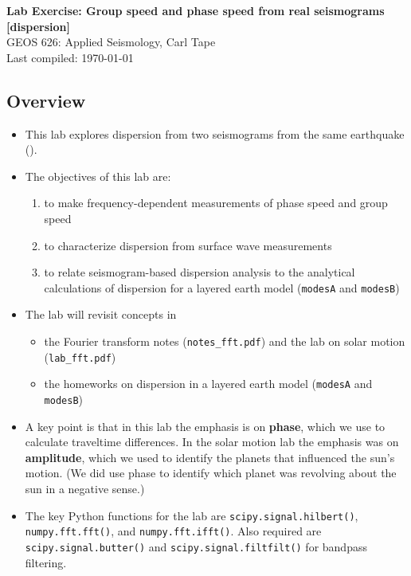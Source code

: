 \documentclass[11pt,titlepage,fleqn]{article}
\begin{document}

\begin{spacing}{1.2}
\centering
{\large \bf Lab Exercise: Group speed and phase speed from real seismograms [dispersion]} \\
GEOS 626: Applied Seismology, Carl Tape \\
Last compiled: \today \\
\end{spacing}


\subsection*{Overview}

\begin{itemize}
\item This lab explores dispersion from two seismograms from the same earthquake ().

\item The objectives of this lab are:
%
\begin{enumerate}
\item to make frequency-dependent measurements of phase speed and group speed
\item to characterize dispersion from surface wave measurements
\item to relate seismogram-based dispersion analysis to the analytical calculations of dispersion for a layered earth model (\verb+modesA+ and \verb+modesB+)
\end{enumerate}

\item The lab will revisit concepts in
%
\begin{itemize}
\item the Fourier transform notes (\verb+notes_fft.pdf+) and the lab on solar motion (\verb+lab_fft.pdf+)
\item the homeworks on dispersion in a layered earth model (\verb+modesA+ and \verb+modesB+)
\end{itemize}

\item A key point is that in this lab the emphasis is on {\bf phase}, which we use to calculate traveltime differences. In the solar motion lab the emphasis was on {\bf amplitude}, which we used to identify the planets that influenced the sun's motion. (We did use phase to identify which planet was revolving about the sun in a negative sense.)

\item The key Python functions for the lab are \verb+scipy.signal.hilbert()+, \verb+numpy.fft.fft()+, and \verb+numpy.fft.ifft()+. Also required are \verb+scipy.signal.butter()+ and \verb+scipy.signal.filtfilt()+ for bandpass filtering.

\end{itemize}
\end{document}
